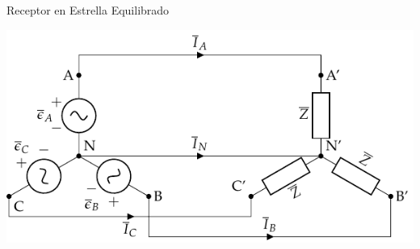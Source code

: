 \documentclass[xcolor={usenames,svgnames,dvipsnames}]{beamer}
\begin{document}
\begin{frame}[label={sec:orgef277c0}]{Receptor en Estrella Equilibrado}
\begin{center}
\includegraphics[width=.9\linewidth]{figs/EstrellaEquilibrado.pdf}
\end{center}
\end{frame}
\end{document}
